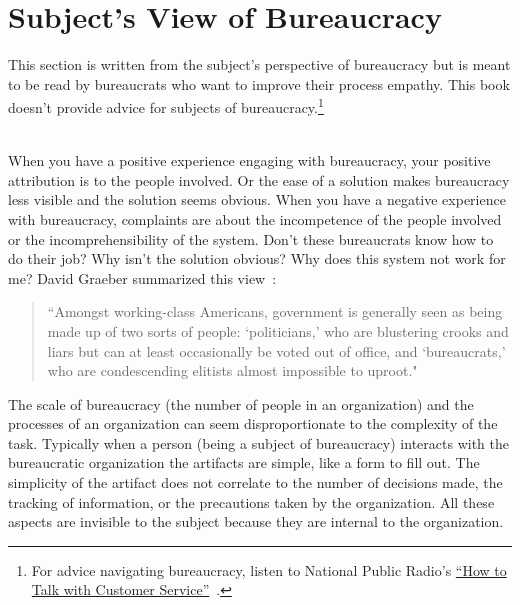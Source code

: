 \section{Subject's View of Bureaucracy\label{sec:subjects-view}}

This section is written from the subject's perspective of bureaucracy but is meant to be read by bureaucrats who want to improve their \gls{process empathy}. This book doesn't provide advice for subjects of bureaucracy.\footnote{For advice navigating bureaucracy, listen to National Public Radio's \href{https://www.npr.org/2022/03/16/1086915600/get-what-you-want-customer-service}{``How to Talk with Customer Service''}~\cite{2022_LifeKit}.} 

\ \\

When you have a positive experience engaging with bureaucracy, your positive attribution is to the people involved. Or the ease of a solution makes bureaucracy less visible and the solution seems obvious. 
When you have a negative experience with bureaucracy, complaints are about the incompetence of the people involved or the incomprehensibility of the system. Don't these bureaucrats know how to do their job? Why isn't the solution obvious? Why does this system not work for me? David Graeber summarized this view~\cite{2015_Graeber_regulation}:
\begin{quote}
 ``Amongst working-class Americans, government is generally seen as being made up of two sorts of people: `politicians,' who are blustering crooks and liars but can at least occasionally be voted out of office, and `bureaucrats,' who are condescending elitists almost impossible to uproot."
\end{quote}



The scale of bureaucracy (the number of people in an organization) and the processes of an organization can seem disproportionate to the complexity of the task. Typically when a person (being a subject of bureaucracy) interacts with the bureaucratic organization the artifacts are simple, like a form to fill out. The simplicity of the artifact does not correlate to the number of decisions made, the tracking of information, or the precautions taken by the organization. All these aspects are invisible to the subject because they are internal to the organization.

